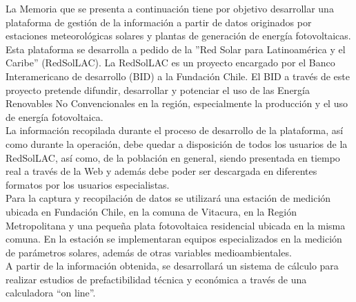 La Memoria que se presenta a continuación tiene por objetivo desarrollar una plataforma de gestión de la información a partir de datos originados por estaciones meteorológicas solares y plantas de generación de energía fotovoltaicas. Esta plataforma se desarrolla a pedido de la ''Red Solar para Latinoamérica y el Caribe'' (RedSolLAC). La RedSolLAC es un proyecto encargado por el Banco Interamericano de desarrollo (BID) a la Fundación Chile. El BID a través de este proyecto pretende difundir, desarrollar y potenciar el uso de las Energía Renovables No Convencionales en la región, especialmente la producción y el uso de energía fotovoltaica.\\

La información recopilada durante el proceso de desarrollo de la plataforma, así como durante la operación, debe quedar a disposición de todos los usuarios de la RedSolLAC, así como, de la población en general, siendo presentada en tiempo real a través de la Web y además debe poder ser descargada en diferentes formatos por los usuarios especialistas.\\

Para la captura y recopilación de datos se utilizará una estación de medición ubicada en Fundación Chile, en la comuna de Vitacura, en la Región Metropolitana y una pequeña plata fotovoltaica residencial ubicada en la misma comuna. En la estación se implementaran equipos especializados en la medición de parámetros solares, además de otras variables medioambientales.\\

A partir de la información obtenida, se desarrollará un sistema de cálculo para realizar estudios de prefactibilidad técnica y económica a través de una calculadora “on line”.
